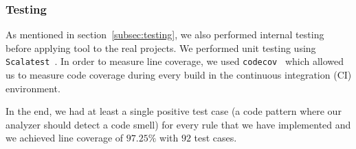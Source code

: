 \FloatBarrier

\subsubsection{Testing}



As mentioned in section~\ref{subsec:testing}, we also performed internal testing before applying tool to the real projects.
We performed unit testing using \verb|Scalatest|~\cite{scalatest}.
In order to measure line coverage, we used \verb|codecov|~\cite{codecov} which allowed us to measure
code coverage during every build in the continuous integration (CI) environment.

In the end, we had at least a single positive test case (a code pattern where our analyzer should detect a code smell)
for every rule that we have implemented and we achieved line coverage of $97.25\%$ with $92$ test cases.
